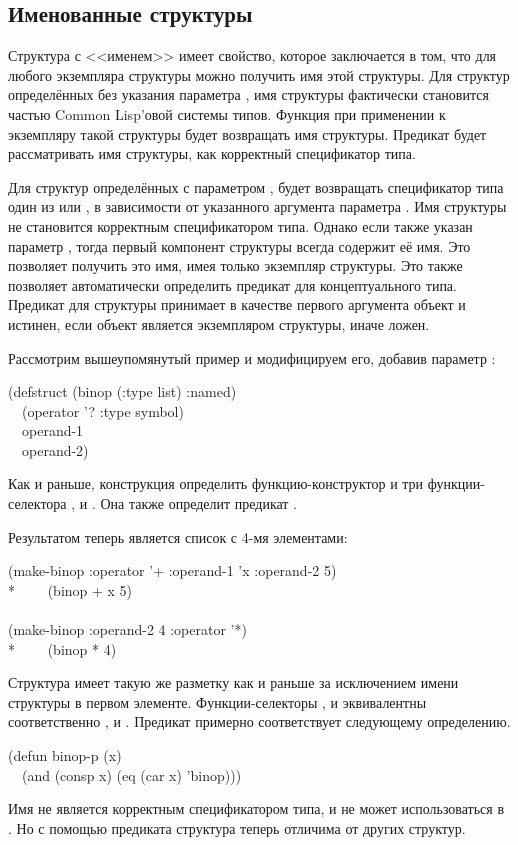 \subsection{Именованные структуры}

Структура с <<именем>> имеет свойство, которое заключается в том, что для любого
экземпляра структуры можно получить имя этой структуры. Для структур
определённых без указания параметра , имя структуры фактически становится
частью Common Lisp'овой системы типов. Функция  при применении к
экземпляру такой структуры будет возвращать имя структуры. Предикат 
будет рассматривать имя структуры, как корректный спецификатор типа.

Для структур определённых с параметром ,  будет
возвращать спецификатор типа один из  или , в
зависимости от указанного аргумента параметра .  Имя структуры не
становится корректным спецификатором типа. Однако если также указан параметр
, тогда первый компонент структуры всегда содержит её имя. Это
позволяет получить это имя, имея только экземпляр структуры. Это также позволяет
автоматически определить предикат для концептуального типа.  Предикат
 для структуры принимает в качестве первого аргумента объект и
истинен, если объект является экземпляром структуры, иначе ложен.

Рассмотрим вышеупомянутый пример  и модифицируем его, добавив
параметр :
\begin{lisp}
(defstruct (binop (:type list) :named) \\
~~(operator '? :type symbol) \\
~~operand-1 \\
~~operand-2)
\end{lisp}
Как и раньше, конструкция определить функцию-конструктор  и три
функции-селектора  ,  и
. Она также определит предикат .

Результатом  теперь является список с 4-мя элементами:
\begin{lisp}
(make-binop :operator '+ :operand-1 'x :operand-2 5) \\*
~~~\EV\ (binop + x 5) \\
\\
(make-binop :operand-2 4 :operator '*) \\*
~~~\EV\ (binop * {\nil} 4)
\end{lisp}
Структура имеет такую же разметку как и раньше за исключением имени структуры в
первом элементе.
Функции-селекторы
, и  эквивалентны
соответственно ,  и .
Предикат  примерно соответствует следующему определению.
\begin{lisp}
(defun binop-p (x) \\
~~(and (consp x) (eq (car x) 'binop)))
\end{lisp}
Имя  не является корректным спецификатором типа, и не может
использоваться в . Но с помощью предиката структура теперь отличима 
от других структур. 

